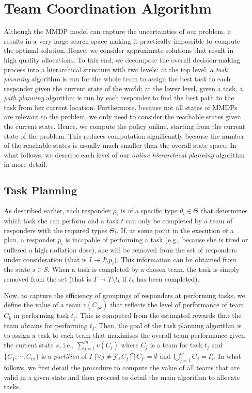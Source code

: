 \section{Team Coordination Algorithm}
\label{sec:algo}
Although the MMDP model can capture the uncertainties of our
problem, it results in a very large search space making it
practically impossible to compute the optimal solution. Hence, we consider approximate solutions that result in
high quality allocations. To this end, we decompose the overall
decision-making process into a hierarchical structure with two
levels: at the top level, a {\em task planning} algorithm is run
for the whole team to assign the best task to each responder given
the current state of the world; at the lower level, given a task, a
{\em path planning} algorithm is run by each responder to find the
best path to the task from her current location. Furthermore,
because not all states of MMDPs are relevant to the problem, we
only need to consider the reachable states given the current state.
Hence, we compute the policy online, starting from the current state
of the problem. This reduces computation significantly
because the number of the reachable states is usually much smaller
than the overall state space. In what follows, we describe each
level of our {\em online hierarchical planning} algorithm in more
detail.

\subsection{Task Planning} \label{sec:taskplanning} As described earlier, each responder $p_i$ is of a specific type
$\theta_i \in \Theta$ that determines which task she can perform
and  a task $t$ can only be completed by a team of responders with
the required types $\Theta_t$. If, at some point in the execution
of a plan, a responder $p_i$ is incapable of performing a task
(e.g., because she is tired or suffered a high radiation dose), she
will be removed from the set of responders under consideration
(that is $I \to I \setminus p_i$). This information can be obtained
from the state $s \in S$. When a task is completed by a chosen
team, the task is simply removed from the set (that is $T \to
T\setminus t_k$ if $t_k$ has been completed).

Now, to capture the efficiency of groupings of responders at
performing tasks, we define the value of a team $v(C_{jk})$ that
reflects the level of performance of team $C_k$ in performing task
$t_j$. This is computed from the estimated rewards that the team
obtains for performing $t_j$.  Then, the goal of the task planning
algorithm is to assign a task to each team that maximises the
overall team performance given the current state $s$, i.e.,
$\sum_{j=1}^m v(C_{j})$ where $C_j$ is a team for task $t_j$ and
$\{ C_1, \cdots, C_m \}$ is a {\em partition} of $I$ ($\forall
j\neq j', C_j \bigcap C_{j'} = \emptyset$ and $\bigcup_{j=1}^m
C_j=I$). In what follows, we first detail the procedure to compute
the value of all teams that are valid in a given state and then
proceed to detail the main algorithm to allocate tasks.


